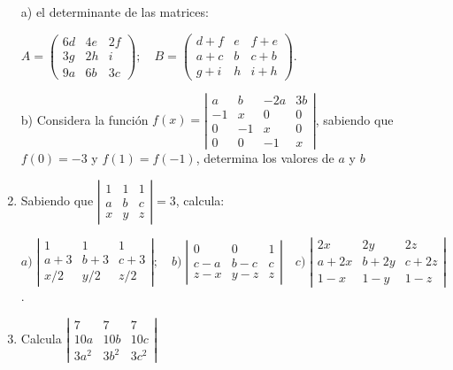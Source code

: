 \begin{enumerate}
a) el determinante de las matrices: 

$A= \left( \begin{matrix} 6d&4e&2f\\3g&2h&i\\9a&6b&3c  \end{matrix} \right); \quad
B=\left( \begin{matrix} d+f&e&f+e\\a+c&b&c+b\\g+i&h&i+h \end{matrix} \right)$.

b) Considera la función $f(x)=\left| \begin{matrix}
a&b&-2a&3b\\-1&x&0&0\\0&-1&x&0\\0&0&-1&x
  \end{matrix} \right|$, sabiendo que $f(0)=-3$ y $f(1)=f(-1)$, determina los valores de $a$ y $b$


\rightline{\textcolor{gris}{Solución: $a)\; |A|=n;\;\; b)\; |B|=36n; \quad b)\; a=0; \; b=-1$.}}

\item Sabiendo que $ \left| \begin{matrix} 1&1&1\\a&b&c\\x&y&z \end{matrix} \right|=3$, calcula:

\footnotesize{$a)\;  \left| \begin{matrix}  1&1&1\\a+3&b+3&c+3\\ x/2&y/2&z/2 \end{matrix} \right|; \quad
b)\;  \left| \begin{matrix} 0&0&1\\c-a&b-c&c\\z-x&y-z&z  \end{matrix} \right| \quad
c)\;  \left| \begin{matrix} 2x&2y&2z\\a+2x&b+2y&c+2z\\1-x&1-y&1-z \end{matrix} \right|$}\normalsize{.}

\rightline{\textcolor{gris}{Solución: $a)\; 3/2; \quad b)\; -3; \quad c)\; -6$.}}

\item Calcula $\left| \begin{matrix} 7&7&7\\ 10a&10b&10c \\ 3a^2&3b^2&3c^2 \end{matrix} \right|$


\end{enumerate}
